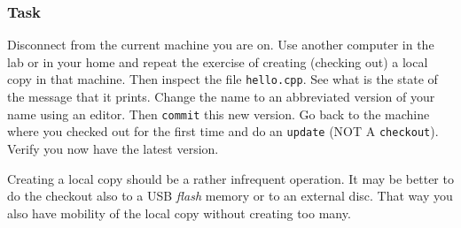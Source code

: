 \documentclass[article,12pt]{article}
\begin{document}
\subsubsection*{Task}
Disconnect from the current machine you are on. Use another computer in the lab
or in your home and repeat the exercise of creating (checking out) a
local copy in that machine. Then inspect the file
{\tt hello.cpp}. See what is the state of the message that
it prints. Change the name to an abbreviated version of your name
using an editor. Then {\tt commit} this new version.
Go back to the machine where you checked out for the first time and
do an {\tt update} (NOT A {\tt checkout}). Verify you
now have the latest version.

Creating a local copy should be a rather infrequent operation.
It may be better to do the checkout also to a
USB {\em flash} memory or to an external disc. That way you also
have mobility of the local copy without creating too many.
\end{document}
